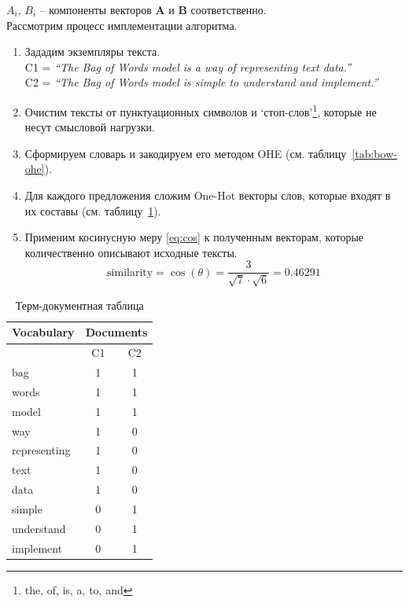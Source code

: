$A_{i}$, $B_{i}$ -- компоненты векторов $\mathbf {A} $ и $ \mathbf {B}$ соответственно.\\
\newpage
Рассмотрим процесс имплементации алгоритма.
\begin{enumerate}

  \item Зададим экземпляры текста.\\C1 = \textit{“The Bag of Words model is a way of representing text data.”}\\
	C2 = \textit{“The Bag of Words model is simple to understand and implement.”}
  \item Очистим тексты от пунктуационных символов и ‘стоп-слов’\footnote{the, of, is, a, to, and}, которые не несут смысловой нагрузки. 
   \item Сформируем словарь и закодируем его методом OHE (см. таблицу~\ref{tab:bow-ohe}).

  \item Для каждого предложения сложим One-Hot векторы слов, которые входят в их составы (см. таблицу~\ref{tab:bow-bow}). 
  
  \item Применим косинусную меру \eqref{eq:cos} к полученным векторам, которые количественно описывают исходные тексты.
\begin{equation*}
{\displaystyle {\text{similarity}}=\cos(\theta )= \frac{3} { \sqrt{7} \cdot  \sqrt{6}}= {0.46291}}
\end{equation*}
\end{enumerate}

\begin{table}
\centering
\caption{\label{tab:bow-bow}Терм-документная таблица}
\begin{tabular}{@{}lcc@{}}
\toprule
Vocabulary   & \multicolumn{2}{l}{Documents} \\ \midrule
             	    & C1            & C2            \\ \midrule
bag          	    & 1               & 1             \\
words           & 1               & 1             \\
model           & 1               & 1             \\
way              & 1               & 0             \\
representing& 1               & 0             \\
text              & 1               & 0             \\
data             & 1               & 0             \\
simple           & 0               & 1             \\
understand   & 0               & 1             \\
implement    & 0               & 1             \\ \bottomrule
\end{tabular}
\end{table}

